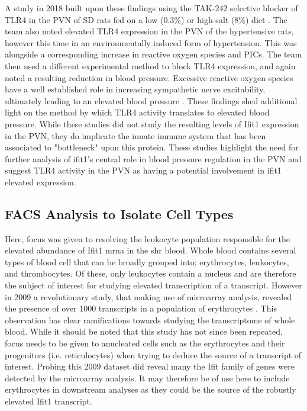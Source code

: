A study in 2018 built upon these findings using the TAK-242 selective blocker of TLR4 in the PVN of SD rats fed on a low (0.3\%) or high-salt (8\%) diet \cite{10.1093/ajh/hpy074}. The team also noted elevated TLR4 expression in the PVN of the hypertensive rats, however this time in an environmentally induced form of hypertension. This was alongside a corresponding increase in reactive oxygen species and PICs. The team then used a different experimental method to block TLR4 expression, and again noted a resulting reduction in blood pressure. Excessive reactive oxygen species have a well established role in increasing sympathetic nerve excitability, ultimately leading to an elevated blood pressure \cite{Su2016}. These findings shed additional light on the method by which TLR4 activity translates to elevated blood pressure. While these studies did not study the resulting levels of Ifit1 expression in the PVN, they do implicate the innate immune system that has been associated to "bottleneck" upon this protein. These studies highlight the need for further analysis of ifit1's central role in blood pressure regulation in the PVN and suggest TLR4 activity in the PVN as having a potential involvement in ifit1 elevated expression. 

\subsection{FACS Analysis to Isolate Cell Types}
Here, focus was given to resolving the leukocyte population responsible for the elevated abundance of Ifit1 \acrshort{mrna} in the \acrshort{shr} blood. Whole blood contains several types of blood cell that can be broadly grouped into; erythrocytes, leukocytes, and thrombocytes. Of these, only leukocytes contain a nucleus and are therefore the subject of interest for studying elevated transcription of a transcript. However in 2009 a revolutionary study, that making use of microarray analysis, revealed the presence of over 1000 transcripts in a population of erythrocytes \cite{Kabanova2009}. This observation has clear ramifications towards studying the transcriptome of whole blood. While it should be noted that this study has not since been repeated, focus needs to be given to anucleated cells such as the erythrocytes and their progenitors (i.e. reticulocytes) when trying to deduce the source of a transcript of interest. Probing this 2009 dataset did reveal many the Ifit family of genes were detected by the microarray analysis. It may therefore be of use here to include erythrocytes in downstream analyses as they could be the source of the robustly elevated Ifit1 transcript. 

